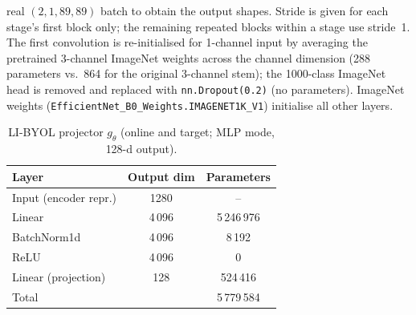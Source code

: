 \begin{table}[ht]
{real $(2,1,89,89)$ batch to obtain the output shapes. Stride is given for each stage's first
block only; the remaining repeated blocks within a stage use stride~1.
The first convolution is re-initialised for 1-channel input by averaging the pretrained
3-channel ImageNet weights across the channel dimension (288 parameters vs.\ 864 for the
original 3-channel stem); the 1000-class ImageNet head is removed and replaced with
\texttt{nn.Dropout(0.2)} (no parameters). ImageNet weights
(\texttt{EfficientNet\_B0\_Weights.IMAGENET1K\_V1}) initialise all other layers.
}
\end{table}

\begin{table}[ht]
\centering
\caption{LI-BYOL projector $g_\theta$ (online and target; MLP mode, 128-d output).}
\label{tab:arch-projector}
\begin{tabular}{lcc}
\toprule
Layer & Output dim & Parameters \\
\midrule
Input (encoder repr.)  & 1280 & -- \\
Linear                 & 4\,096 & 5\,246\,976 \\
BatchNorm1d            & 4\,096 & 8\,192 \\
ReLU                   & 4\,096 & 0 \\
Linear (projection)    & 128  & 524\,416 \\
\midrule
Total                  &      & 5\,779\,584 \\
\bottomrule
\end{tabular}
\end{table}

